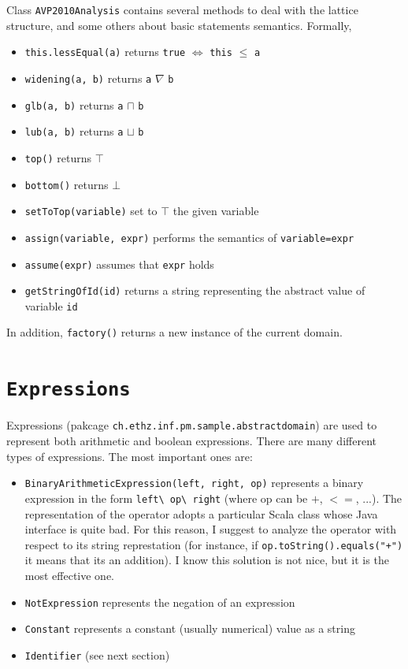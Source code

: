 \documentclass[11pt]{article}
\newcommand{\statement}[1]{\lstinline{#1}}
\begin{document}
Class \statement{AVP2010Analysis} contains several methods to deal with the lattice structure, and some others about basic statements semantics. Formally,
\begin{itemize}
\item \statement{this.lessEqual(a)} returns \statement{true} $\Leftrightarrow$ \statement{this} $\leq$ \statement{a}
\item \statement{widening(a, b)} returns \statement{a} $\nabla$ \statement{b}
\item \statement{glb(a, b)} returns \statement{a} $\sqcap$ \statement{b}
\item \statement{lub(a, b)} returns \statement{a} $\sqcup$ \statement{b}
\item \statement{top()} returns $\top$
\item \statement{bottom()} returns $\bot$
\item \statement{setToTop(variable)} set to $\top$ the given variable
\item \statement{assign(variable, expr)} performs the semantics of \statement{variable=expr}
\item \statement{assume(expr)} assumes that \statement{expr} holds
\item \statement{getStringOfId(id)} returns a string representing the abstract value of variable \statement{id}
\end{itemize}
In addition, \statement{factory()} returns a new instance of the current domain.


\section{\statement{Expressions}}
Expressions (pakcage \statement{ch.ethz.inf.pm.sample.abstractdomain}) are used to represent both arithmetic and boolean expressions. There are many different types of expressions. The most important ones are:
\begin{itemize}
\item \statement{BinaryArithmeticExpression(left, right, op)} represents a binary expression in the form \statement{left\ op\ right} (where op can be $+$, $<=$, ...). The representation of the operator adopts a particular Scala class whose Java interface is quite bad. For this reason, I suggest to analyze the operator with respect to its string represtation (for instance, if \statement{op.toString().equals("+")} it means that its an addition). I know this solution is not nice, but it is the most effective one.
\item \statement{NotExpression} represents the negation of an expression
\item \statement{Constant} represents a constant (usually numerical) value as a string
\item \statement{Identifier} (see next section)
\end{itemize}
\end{document}
